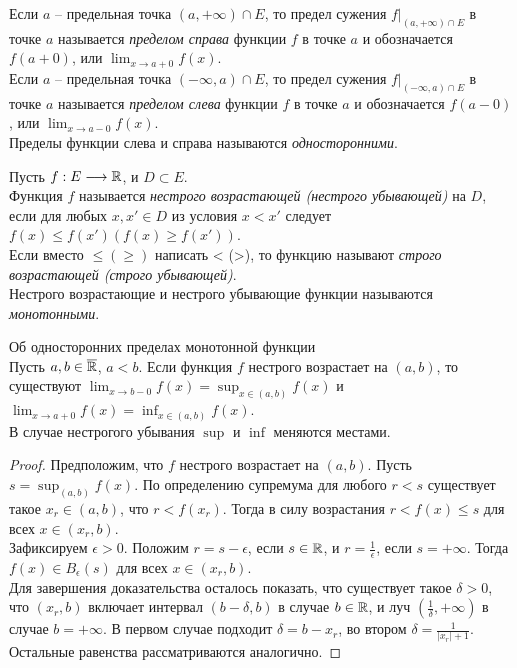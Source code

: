     \begin{definition}
        Если $a$ -- предельная точка $(a, +\infty) \cap E$, то предел сужения $f|_{(a, +\infty) \cap E}$ в точке $a$ называется \textit{пределом справа} функции $f$ в точке $a$ и обозначается $f(a+0)$, или $\lim_{x \to a+0} f(x)$.
        \\
        Если $a$ -- предельная точка $(-\infty, a) \cap E$, то предел сужения $f|_{(-\infty, a) \cap E}$ в точке $a$ называется \textit{пределом слева} функции $f$ в точке $a$ и обозначается $f(a-0)$, или $\lim_{x \to a-0} f(x)$.
        \\
        Пределы функции слева и справа называются \textit{односторонними}.
    \end{definition}
    
    \begin{definition}
        Пусть $f: E \longrightarrow \mathbb{R}$, и $D \subset E$.\\
        Функция $f$ называется \textit{нестрого возрастающей (нестрого убывающей)} на $D$, если для любых $x, x' \in D$ из условия $x < x'$ следует $f(x) \leq f(x') (f(x) \geq f(x'))$.\\
        Если вместо $\leq (\geq)$ написать < (>), то функцию называют \textit{строго возрастающей (строго убывающей)}.\\
        Нестрого возрастающие и нестрого убывающие функции называются \textit{монотонными}.
    \end{definition}
    
    \begin{theorem}{Об односторонних пределах монотонной функции}\\
        Пусть $a, b \in \overline{\mathbb{R}}$, $a < b$. Если функция $f$ нестрого возрастает на $(a, b)$, то существуют $\lim_{x \to b-0} f(x) = \sup_{x \in (a, b)} f(x)$ и $\lim_{x \to a+0} f(x) = \inf_{x \in (a, b)} f(x)$.\\
        В случае нестрогого убывания $\sup$ и $\inf$ меняются местами.\\
    \end{theorem}
    
    \begin{proof}
        Предположим, что $f$ нестрого возрастает на $(a, b)$. Пусть $s = \sup_{(a,b)} f(x)$. По определению супремума для любого $r < s$ существует такое $x_{r} \in (a,b)$, что $r < f(x_{r})$. Тогда в силу возрастания $r < f(x) \leq s$ для всех $x \in (x_{r}, b)$.\\
        Зафиксируем $\epsilon > 0$. Положим $r = s - \epsilon$, если $s \in \mathbb{R}$, и $r = \frac{1}{\epsilon}$, если $s = +\infty$. Тогда $f(x) \in B_{\epsilon}(s)$ для всех $x \in (x_{r}, b)$.\\
        Для завершения доказательства осталось показать, что существует такое $\delta > 0$, что $(x_{r}, b)$ включает интервал $(b - \delta, b)$ в случае $b \in \mathbb{R}$, и луч $(\frac{1}{\delta} , +\infty)$ в случае $b = +\infty$. В первом случае подходит $\delta = b - x_{r}$, во втором $\delta = \frac{1}{|x_{r}| + 1}$.\\
        Остальные равенства рассматриваются аналогично.
    \end{proof}

